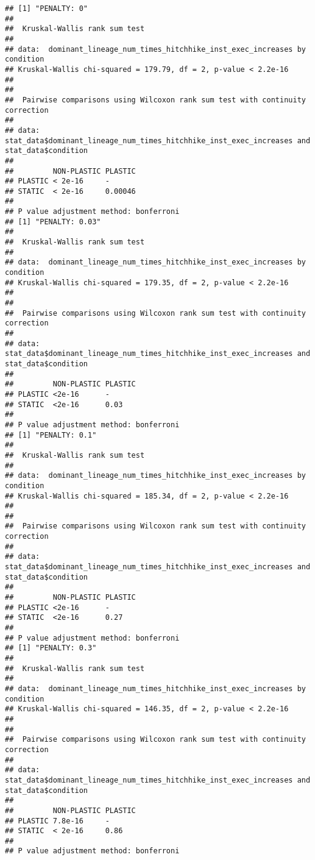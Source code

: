 \documentclass[]{book}
\newenvironment{Shaded}{\begin{snugshade}}{\end{snugshade}}
\newcommand{\CommentTok}[1]{\textcolor[rgb]{0.56,0.35,0.01}{\textit{#1}}}
\begin{document}
\begin{verbatim}
## [1] "PENALTY: 0"
## 
##  Kruskal-Wallis rank sum test
## 
## data:  dominant_lineage_num_times_hitchhike_inst_exec_increases by condition
## Kruskal-Wallis chi-squared = 179.79, df = 2, p-value < 2.2e-16
## 
## 
##  Pairwise comparisons using Wilcoxon rank sum test with continuity correction 
## 
## data:  stat_data$dominant_lineage_num_times_hitchhike_inst_exec_increases and stat_data$condition 
## 
##         NON-PLASTIC PLASTIC
## PLASTIC < 2e-16     -      
## STATIC  < 2e-16     0.00046
## 
## P value adjustment method: bonferroni 
## [1] "PENALTY: 0.03"
## 
##  Kruskal-Wallis rank sum test
## 
## data:  dominant_lineage_num_times_hitchhike_inst_exec_increases by condition
## Kruskal-Wallis chi-squared = 179.35, df = 2, p-value < 2.2e-16
## 
## 
##  Pairwise comparisons using Wilcoxon rank sum test with continuity correction 
## 
## data:  stat_data$dominant_lineage_num_times_hitchhike_inst_exec_increases and stat_data$condition 
## 
##         NON-PLASTIC PLASTIC
## PLASTIC <2e-16      -      
## STATIC  <2e-16      0.03   
## 
## P value adjustment method: bonferroni 
## [1] "PENALTY: 0.1"
## 
##  Kruskal-Wallis rank sum test
## 
## data:  dominant_lineage_num_times_hitchhike_inst_exec_increases by condition
## Kruskal-Wallis chi-squared = 185.34, df = 2, p-value < 2.2e-16
## 
## 
##  Pairwise comparisons using Wilcoxon rank sum test with continuity correction 
## 
## data:  stat_data$dominant_lineage_num_times_hitchhike_inst_exec_increases and stat_data$condition 
## 
##         NON-PLASTIC PLASTIC
## PLASTIC <2e-16      -      
## STATIC  <2e-16      0.27   
## 
## P value adjustment method: bonferroni 
## [1] "PENALTY: 0.3"
## 
##  Kruskal-Wallis rank sum test
## 
## data:  dominant_lineage_num_times_hitchhike_inst_exec_increases by condition
## Kruskal-Wallis chi-squared = 146.35, df = 2, p-value < 2.2e-16
## 
## 
##  Pairwise comparisons using Wilcoxon rank sum test with continuity correction 
## 
## data:  stat_data$dominant_lineage_num_times_hitchhike_inst_exec_increases and stat_data$condition 
## 
##         NON-PLASTIC PLASTIC
## PLASTIC 7.8e-16     -      
## STATIC  < 2e-16     0.86   
## 
## P value adjustment method: bonferroni
\end{verbatim}

\begin{Shaded}
\end{Shaded}
\end{document}
